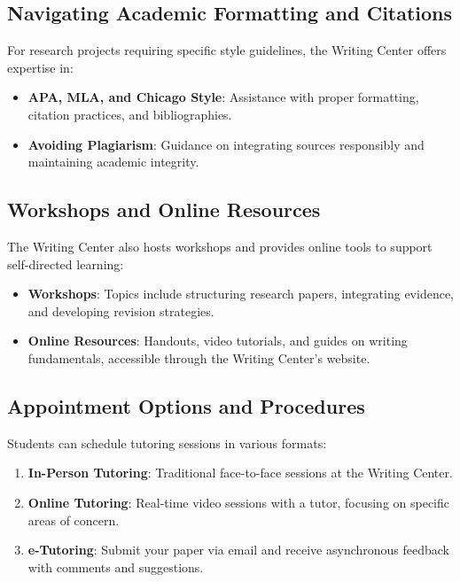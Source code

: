 \documentclass[
]{book}
\providecommand{\tightlist}{%
  \setlength{\itemsep}{0pt}\setlength{\parskip}{0pt}}
\begin{document}
\subsection*{Navigating Academic Formatting and Citations}\label{navigating-academic-formatting-and-citations}

For research projects requiring specific style guidelines, the Writing Center offers expertise in:

\begin{itemize}
\tightlist
\item
  \textbf{APA, MLA, and Chicago Style}: Assistance with proper formatting, citation practices, and bibliographies.
\item
  \textbf{Avoiding Plagiarism}: Guidance on integrating sources responsibly and maintaining academic integrity.
\end{itemize}

\subsection*{Workshops and Online Resources}\label{workshops-and-online-resources}

The Writing Center also hosts workshops and provides online tools to support self-directed learning:

\begin{itemize}
\tightlist
\item
  \textbf{Workshops}: Topics include structuring research papers, integrating evidence, and developing revision strategies.
\item
  \textbf{Online Resources}: Handouts, video tutorials, and guides on writing fundamentals, accessible through the Writing Center's website.
\end{itemize}

\subsection*{Appointment Options and Procedures}\label{appointment-options-and-procedures}

Students can schedule tutoring sessions in various formats:

\begin{enumerate}
\def\labelenumi{\arabic{enumi}.}
\tightlist
\item
  \textbf{In-Person Tutoring}: Traditional face-to-face sessions at the Writing Center.
\item
  \textbf{Online Tutoring}: Real-time video sessions with a tutor, focusing on specific areas of concern.
\item
  \textbf{e-Tutoring}: Submit your paper via email and receive asynchronous feedback with comments and suggestions.
\end{enumerate}
\end{document}
